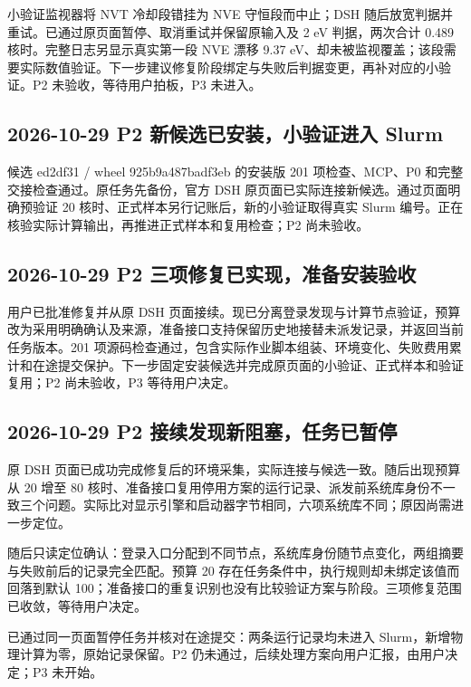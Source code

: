 \documentclass[11pt,a4paper]{ctexart}
\begin{document}
小验证监视器将 NVT 冷却段错挂为 NVE 守恒段而中止；DSH 随后放宽判据并重试。已通过原页面暂停、取消重试并保留原输入及 2 eV 判据，两次合计 0.489 核时。完整日志另显示真实第一段 NVE 漂移 9.37 eV、却未被监视覆盖；该段需要实际数值验证。下一步建议修复阶段绑定与失败后判据变更，再补对应的小验证。P2 未验收，等待用户拍板，P3 未进入。



\subsection{2026-10-29 P2 新候选已安装，小验证进入 Slurm}


候选 ed2df31 /\allowbreak{} wheel 925b9a487badf3eb 的安装版 201 项检查、MCP、P0 和完整交接检查通过。原任务先备份，官方 DSH 原页面已实际连接新候选。通过页面明确预验证 20 核时、正式样本另行记账后，新的小验证取得真实 Slurm 编号。正在核验实际计算输出，再推进正式样本和复用检查；P2 尚未验收。



\subsection{2026-10-29 P2 三项修复已实现，准备安装验收}


用户已批准修复并从原 DSH 页面接续。现已分离登录发现与计算节点验证，预算改为采用明确确认及来源，准备接口支持保留历史地接替未派发记录，并返回当前任务版本。201 项源码检查通过，包含实际作业脚本组装、环境变化、失败费用累计和在途提交保护。下一步固定安装候选并完成原页面的小验证、正式样本和验证复用；P2 尚未验收，P3 等待用户决定。



\subsection{2026-10-29 P2 接续发现新阻塞，任务已暂停}


原 DSH 页面已成功完成修复后的环境采集，实际连接与候选一致。随后出现预算从 20 增至 80 核时、准备接口复用停用方案的运行记录、派发前系统库身份不一致三个问题。实际比对显示引擎和启动器字节相同，六项系统库不同；原因尚需进一步定位。



随后只读定位确认：登录入口分配到不同节点，系统库身份随节点变化，两组摘要与失败前后的记录完全匹配。预算 20 存在任务条件中，执行规则却未绑定该值而回落到默认 100；准备接口的重复识别也没有比较验证方案与阶段。三项修复范围已收敛，等待用户决定。



已通过同一页面暂停任务并核对在途提交：两条运行记录均未进入 Slurm，新增物理计算为零，原始记录保留。P2 仍未通过，后续处理方案向用户汇报，由用户决定；P3 未开始。
\end{document}
